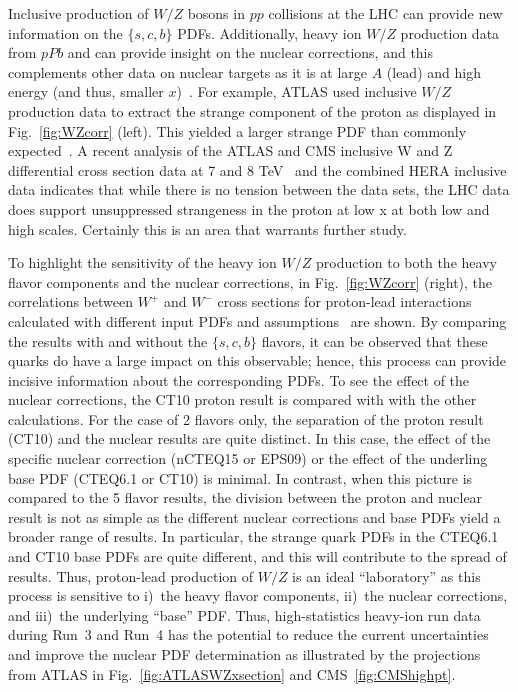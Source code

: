\documentclass[../report.tex]{subfiles}
\begin{document}
%
%
Inclusive production of $W/Z$ bosons in $pp$ collisions at the LHC  can provide
new information on the $\{s,c,b\}$ PDFs.
Additionally, heavy ion $W/Z$ production data from $pPb$ and \PbPb can provide insight on 
the nuclear corrections, 
and this complements other data on nuclear targets as it is at large $A$ (lead) and high energy (and thus, smaller $x$)~\cite{Aad:2015gta,TheATLAScollaboration:2015lnm,Khachatryan:2015pzs,Khachatryan:2015hha,CMS:2018ilq,Aaij:2014pvu,Alice:2016wka,CMS:2018ilq}.
%
%
For example, ATLAS used  inclusive $W/Z$ production data to extract the strange component of the proton 
as displayed in Fig.~\ref{fig:WZcorr} (left). This yielded a larger strange PDF than commonly expected~\cite{Aad:2012sb,Aaboud:2016btc}. 
%
A recent analysis of the ATLAS and CMS inclusive W and Z differential
cross section data at 7 and 8 TeV~\cite{Cooper-Sarkar:2018ufj} and the combined HERA inclusive data indicates that while there is no tension between the
data sets, the  LHC data does support unsuppressed strangeness
in the proton at low x at both low and high scales. 
Certainly this is an area that warrants further study. 

To highlight the sensitivity of the heavy ion $W/Z$ production to both the 
heavy flavor components and the nuclear corrections, 
in Fig.~\ref{fig:WZcorr} (right), the correlations between $W^+$ and $W^-$ 
cross sections for proton-lead interactions calculated with different input PDFs and assumptions~\cite{Kusina:2016fxy} are shown.
%
By comparing the results with and without the $\{s,c,b\}$ flavors, it can be observed that these quarks do have a
large impact on this observable;  hence, this process can provide incisive information about the 
corresponding PDFs. 
%
To see the effect of the nuclear corrections, the CT10 proton result is compared with with the other calculations. 
%
For the case of 2 flavors only, the separation of the proton result  (CT10) and the 
nuclear results are quite distinct. In this case, the effect of the specific nuclear correction (nCTEQ15 or EPS09)
or the effect of the underling base PDF (CTEQ6.1 or CT10) is minimal. 
%
In contrast, when this picture is compared to the 5 flavor results, the division between the proton and nuclear
result is not as simple as the different nuclear corrections and base PDFs yield a broader range of results. 
In particular, the strange quark PDFs in the CTEQ6.1 and CT10 base PDFs are quite different, and this will contribute to the spread of results. 
%
Thus, proton-lead  production of $W/Z$  is an ideal ``laboratory'' 
as this process is sensitive to i)~the heavy flavor components,
ii)~the nuclear corrections, and iii)~the underlying ``base'' PDF. 
%
Thus, high-statistics heavy-ion run data during Run~3 and Run~4 has the potential 
to reduce  the current uncertainties and improve the nuclear PDF determination as illustrated by the projections from ATLAS in Fig.~\ref{fig:ATLASWZxsection} and CMS~\ref{fig:CMShighpt}.
\end{document}
